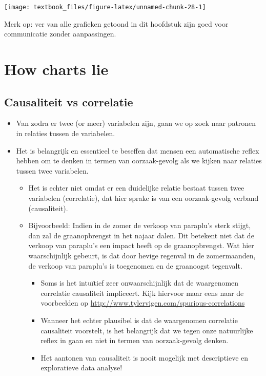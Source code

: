 \documentclass[]{tufte-book}
\providecommand{\tightlist}{%
  \setlength{\itemsep}{0pt}\setlength{\parskip}{0pt}}
\begin{document}
\texttt{[image: textbook\_files/figure-latex/unnamed-chunk-28-1]}

Merk op: ver van alle grafieken getoond in dit hoofdstuk zijn goed voor communicatie zonder aanpassingen.

\hypertarget{how-charts-lie}{%
\section{How charts lie}\label{how-charts-lie}}

\hypertarget{causaliteit-vs-correlatie}{%
\subsection{Causaliteit vs correlatie}\label{causaliteit-vs-correlatie}}

\begin{itemize}
\tightlist
\item
  Van zodra er twee (or meer) variabelen zijn, gaan we op zoek naar patronen in relaties tussen de variabelen.
\item
  Het is belangrijk en essentieel te beseffen dat mensen een automatische reflex hebben om te denken in termen van oorzaak-gevolg als we kijken naar relaties tussen twee variabelen.

  \begin{itemize}
  \tightlist
  \item
    Het is echter niet omdat er een duidelijke relatie bestaat tussen twee variabelen (correlatie), dat hier sprake is van een oorzaak-gevolg verband (causaliteit).
  \item
    Bijvoorbeeld: Indien in de zomer de verkoop van paraplu's sterk stijgt, dan zal de graanopbrengst in het najaar dalen. Dit betekent niet dat de verkoop van paraplu's een impact heeft op de graanopbrengst. Wat hier waarschijnlijk gebeurt, is dat door hevige regenval in de zomermaanden, de verkoop van paraplu's is toegenomen en de graanoogst tegenvalt.

    \begin{itemize}
    \tightlist
    \item
      Soms is het intuïtief zeer onwaarschijnlijk dat de waargenomen correlatie causaliteit impliceert. Kijk hiervoor maar eens naar de voorbeelden op \url{http://www.tylervigen.com/spurious-correlations}
    \item
      Wanneer het echter plausibel is dat de waargenomen correlatie causaliteit voorstelt, is het belangrijk dat we tegen onze natuurlijke reflex in gaan en niet in termen van oorzaak-gevolg denken.
    \item
      Het aantonen van causaliteit is nooit mogelijk met descriptieve en exploratieve data analyse!
    \end{itemize}
  \end{itemize}
\end{itemize}
\end{document}
